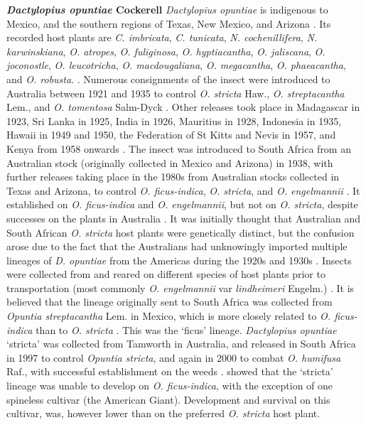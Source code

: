 \noindent \textbf{\textit{Dactylopius opuntiae} Cockerell} 
\label{info:opuntiaeLineages} \newline 
\noindent \textit{Dactylopius opuntiae} is indigenous to Mexico, and the southern regions of Texas, New Mexico, and Arizona  \citep{Mann1969Cactus-feedingMites}. Its recorded host plants are \textit{C. imbricata}, \textit{C. tunicata}, \textit{N. cochenillifera}, \textit{N. karwinskiana}, \textit{O. atropes}, \textit{O. fuliginosa}, \textit{O. hyptiacantha}, \textit{O. jaliscana}, \textit{O. joconostle}, \textit{O. leucotricha}, \textit{O. macdougaliana}, \textit{O. megacantha}, \textit{O. phaeacantha}, and \textit{O. robusta}. \citep{Mann1969Cactus-feedingMites, Chavez-Moreno2011DistributionOpuntioideae}. Numerous consignments of the insect were introduced to Australia between 1921 and 1935 to control \textit{O. stricta} Haw., \textit{O. streptacantha} Lem., and \textit{O. tomentosa} Salm-Dyck \citep{Dodd1940, Winston2014BiologicalWeeds.}.
Other releases took place in Madagascar in 1923, Sri Lanka in 1925, India in 1926, Mauritius in 1928, Indonesia in 1935, Hawaii in 1949 and 1950, the Federation of St Kitts and Nevis in 1957, and Kenya from 1958 onwards \citep{Winston2014BiologicalWeeds.}.
The insect was introduced to South Africa from an Australian stock (originally collected in Mexico and Arizona) in 1938, with further releases taking place in the 1980s from Australian stocks collected in Texas and Arizona, to control \textit{O. ficus-indica}, \textit{O. stricta}, and \textit{O. engelmannii} \citep{Volchansky1999, Winston2014BiologicalWeeds.}. It established on \textit{O. ficus-indica} and \textit{O. engelmannii}, but not on \textit{O. stricta}, despite successes on the plants in Australia \citep{Volchansky1999}. It was initially thought that Australian and South African \textit{O. stricta} host plants were genetically distinct, but the confusion arose due to the fact that the Australians had unknowingly imported multiple lineages of \textit{D. opuntiae} from the Americas during the 1920s and 1930s \citep{Dodd1940, Volchansky1999}. Insects were collected from and reared on different species of host plants prior to transportation (most commonly \textit{O. engelmannii} var \textit{lindheimeri} Engelm.) \citep{Dodd1940}. It is believed that the lineage originally sent to South Africa was collected from \textit{Opuntia streptacantha} Lem. in Mexico, which is more closely related to \textit{O. ficus-indica} than to \textit{O. stricta} \citep{Volchansky1999}. This was the `ficus' lineage. \textit{Dactylopius opuntiae} `stricta' was collected from Tamworth in Australia, and released in South Africa in 1997 to control \textit{Opuntia stricta}, and again in 2000 to combat \textit{O. humifusa} Raf., with successful establishment on the weeds \citep{Hoffmann2004, rule2018performance}. \citet{githure1999host} showed that the `stricta' lineage was unable to develop on \textit{O. ficus-indica}, with the exception of one spineless cultivar (the American Giant). Development and survival on this cultivar, was, however lower than on the preferred \textit{O. stricta} host plant. \newline 
